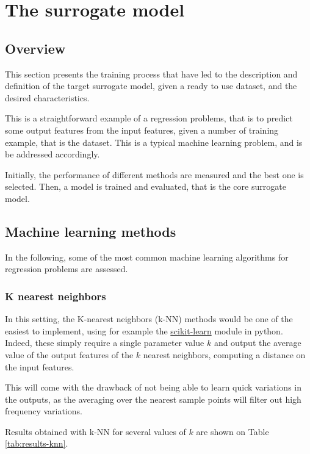 \section{The surrogate model}

\subsection{Overview}

This section presents the training process that have led to the description and definition of the target surrogate model, given a ready to use dataset, and the desired characteristics.

This is a straightforward example of a regression problems, that is to predict some output features from the input features, given a number of training example, that is the dataset. This is a typical machine learning problem, and is be addressed accordingly.

Initially, the performance of different methods are measured and the best one is selected. Then, a model is trained and evaluated, that is the core surrogate model.

\subsection{Machine learning methods}

In the following, some of the most common machine learning algorithms for regression problems \cite{machine-learning-class} are assessed.

\subsubsection{K nearest neighbors}

In this setting, the K-nearest neighbors (k-NN) methods would be one of the easiest to implement, using for example the \href{https://scikit-learn.org/stable/modules/neighbors.html\#nearest-neighbors-regression}{scikit-learn} \cite{scikit-learn} module in python. Indeed, these simply require a single parameter value $k$ and output the average value of the output features of the $k$ nearest neighbors, computing a distance on the input features.

This will come with the drawback of not being able to learn quick variations in the outputs, as the averaging over the nearest sample points will filter out high frequency variations.

Results obtained with k-NN for several values of $k$ are shown on Table \ref{tab:results-knn}.

